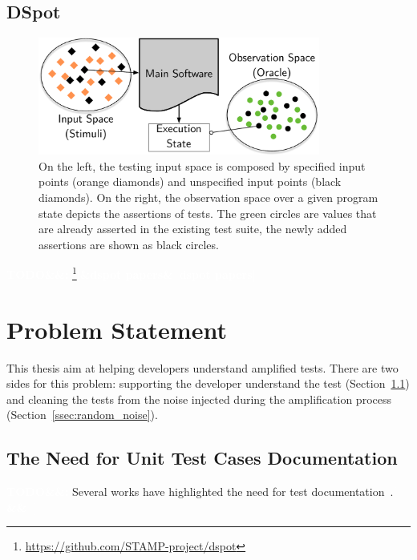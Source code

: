 \documentclass[11pt]{sdm_internship}
\newcommand{\addref}[1]{\colorbox{TealBlue!100}{\textcolor{white}{\textbf{$[$\ifx&#1&\ \else#1\fi$]$}}}}
\newcommand{\todo}[1]{\colorbox{Red!75}{\textcolor{white}{\textbf{TODO\ifx&#1&\else: #1\fi}}}}
\newcommand{\dspot}{DSpot\xspace}
\theoremstyle{definition}
\begin{document}
\subsection{\dspot{}}%
\label{ssec:dspot}
\begin{figure}
  \centering
  \includegraphics[width=25em]{spaces_report}
  \caption{On the left, the testing input space is composed by specified input points (orange diamonds) and unspecified input points (black diamonds). On the right, the observation space over a given program state depicts the assertions of tests. The green circles are values that are already asserted in the existing test suite, the newly added assertions are shown as black circles.}%
\label{fig:spaces}
\end{figure}
\todo{}
\footnote{\url{https://github.com/STAMP-project/dspot}}\addref{dspot papers}\cite{baudry2015automatic,baudry2014tailored,baudry2015dspot}

\cite{pawlak2016spoon}


\section{Problem Statement}%
\label{sec:problem_statement}
This thesis aim at helping developers understand amplified tests.
There are two sides for this problem: supporting the developer understand the test (Section~\ref{ssec:need_doc}) and cleaning the tests from the noise injected during the amplification process (Section~\ref{ssec:random_noise}).

\subsection{The Need for Unit Test Cases Documentation}%
\label{ssec:need_doc}
\todo{}
Several works have highlighted the need for test documentation~\cite{prado2015wap,prado2016advances,prado2018towards,li2016automatically,daka2014survey,panichella2016impact}.\addref{}
\end{document}
